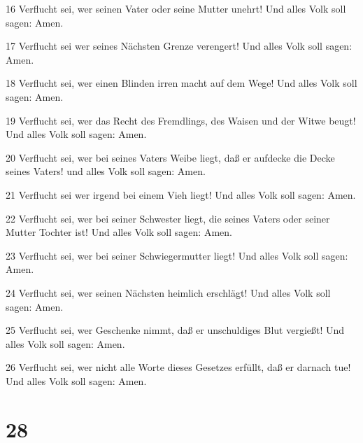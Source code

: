 \par 16 Verflucht sei, wer seinen Vater oder seine Mutter unehrt! Und alles Volk soll sagen: Amen.
\par 17 Verflucht sei wer seines Nächsten Grenze verengert! Und alles Volk soll sagen: Amen.
\par 18 Verflucht sei, wer einen Blinden irren macht auf dem Wege! Und alles Volk soll sagen: Amen.
\par 19 Verflucht sei, wer das Recht des Fremdlings, des Waisen und der Witwe beugt! Und alles Volk soll sagen: Amen.
\par 20 Verflucht sei, wer bei seines Vaters Weibe liegt, daß er aufdecke die Decke seines Vaters! und alles Volk soll sagen: Amen.
\par 21 Verflucht sei wer irgend bei einem Vieh liegt! Und alles Volk soll sagen: Amen.
\par 22 Verflucht sei, wer bei seiner Schwester liegt, die seines Vaters oder seiner Mutter Tochter ist! Und alles Volk soll sagen: Amen.
\par 23 Verflucht sei, wer bei seiner Schwiegermutter liegt! Und alles Volk soll sagen: Amen.
\par 24 Verflucht sei, wer seinen Nächsten heimlich erschlägt! Und alles Volk soll sagen: Amen.
\par 25 Verflucht sei, wer Geschenke nimmt, daß er unschuldiges Blut vergießt! Und alles Volk soll sagen: Amen.
\par 26 Verflucht sei, wer nicht alle Worte dieses Gesetzes erfüllt, daß er darnach tue! Und alles Volk soll sagen: Amen.

\chapter{28}


